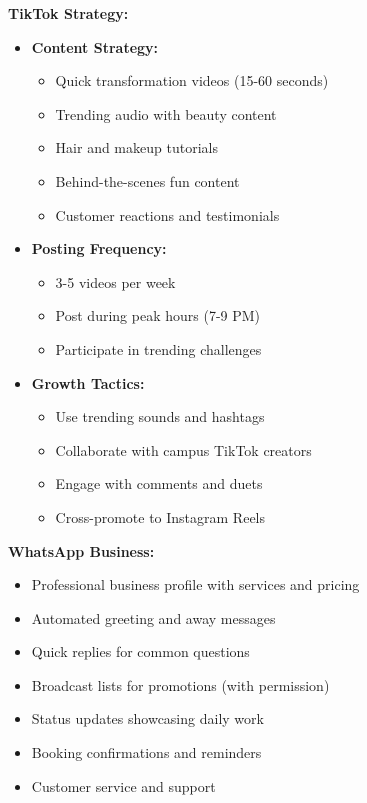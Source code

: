 \documentclass[a4paper,12pt]{article}
\begin{document}
\textbf{TikTok Strategy:}
\begin{itemize}[leftmargin=2em]
    \item \textbf{Content Strategy:}
    \begin{itemize}
        \item Quick transformation videos (15-60 seconds)
        \item Trending audio with beauty content
        \item Hair and makeup tutorials
        \item Behind-the-scenes fun content
        \item Customer reactions and testimonials
    \end{itemize}
    
    \item \textbf{Posting Frequency:}
    \begin{itemize}
        \item 3-5 videos per week
        \item Post during peak hours (7-9 PM)
        \item Participate in trending challenges
    \end{itemize}
    
    \item \textbf{Growth Tactics:}
    \begin{itemize}
        \item Use trending sounds and hashtags
        \item Collaborate with campus TikTok creators
        \item Engage with comments and duets
        \item Cross-promote to Instagram Reels
    \end{itemize}
\end{itemize}

\textbf{WhatsApp Business:}
\begin{itemize}[leftmargin=2em]
    \item Professional business profile with services and pricing
    \item Automated greeting and away messages
    \item Quick replies for common questions
    \item Broadcast lists for promotions (with permission)
    \item Status updates showcasing daily work
    \item Booking confirmations and reminders
    \item Customer service and support
\end{itemize}
\end{document}
